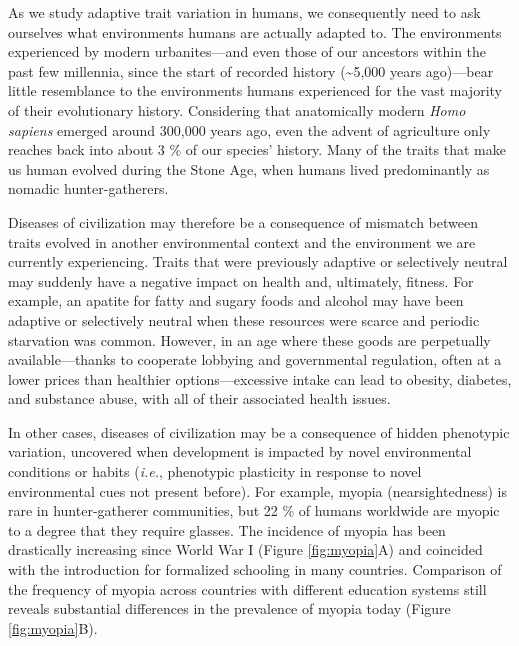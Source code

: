 \documentclass[
]{book}
\begin{document}
As we study adaptive trait variation in humans, we consequently need to ask ourselves what environments humans are actually adapted to. The environments experienced by modern urbanites---and even those of our ancestors within the past few millennia, since the start of recorded history (\textasciitilde5,000 years ago)---bear little resemblance to the environments humans experienced for the vast majority of their evolutionary history. Considering that anatomically modern \emph{Homo sapiens} emerged around 300,000 years ago, even the advent of agriculture only reaches back into about 3 \% of our species' history. Many of the traits that make us human evolved during the Stone Age, when humans lived predominantly as nomadic hunter-gatherers.

Diseases of civilization may therefore be a consequence of mismatch between traits evolved in another environmental context and the environment we are currently experiencing. Traits that were previously adaptive or selectively neutral may suddenly have a negative impact on health and, ultimately, fitness. For example, an apatite for fatty and sugary foods and alcohol may have been adaptive or selectively neutral when these resources were scarce and periodic starvation was common. However, in an age where these goods are perpetually available---thanks to cooperate lobbying and governmental regulation, often at a lower prices than healthier options---excessive intake can lead to obesity, diabetes, and substance abuse, with all of their associated health issues.

In other cases, diseases of civilization may be a consequence of hidden phenotypic variation, uncovered when development is impacted by novel environmental conditions or habits (\emph{i.e.}, phenotypic plasticity in response to novel environmental cues not present before). For example, myopia (nearsightedness) is rare in hunter-gatherer communities, but 22 \% of humans worldwide are myopic to a degree that they require glasses. The incidence of myopia has been drastically increasing since World War I (Figure \ref{fig:myopia}A) and coincided with the introduction for formalized schooling in many countries. Comparison of the frequency of myopia across countries with different education systems still reveals substantial differences in the prevalence of myopia today (Figure \ref{fig:myopia}B).
\end{document}
